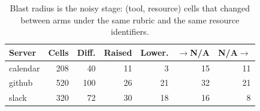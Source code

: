 \begin{table}[t]
  \centering
  \small
  \caption{Blast radius is the noisy stage: (tool, resource) cells that changed
    between arms under the same rubric and the same resource identifiers.}
  \label{tab:blast}
  \begin{tabular}{lrrrrrr}
    \toprule
    Server & Cells & Diff. & Raised & Lower. & $\to$N/A & N/A$\to$ \\
    \midrule
    calendar & 208 & 40  & 11 & 3  & 15 & 11 \\
    github   & 520 & 100 & 26 & 21 & 32 & 21 \\
    slack    & 320 & 72  & 30 & 18 & 16 & 8  \\
    \bottomrule
  \end{tabular}
\end{table}

